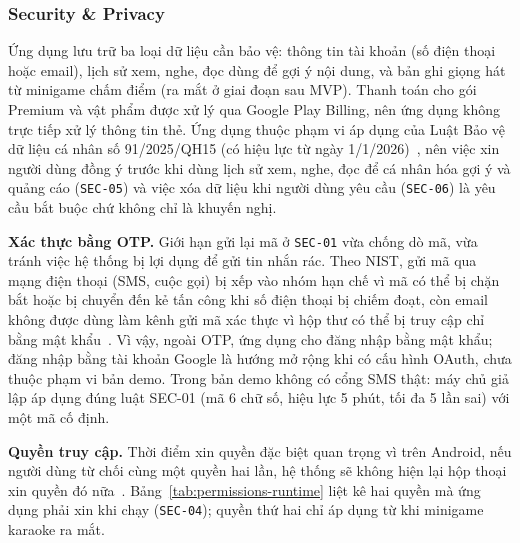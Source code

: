\subsubsection{Security \& Privacy}

Ứng dụng lưu trữ ba loại dữ liệu cần bảo vệ: thông tin tài khoản (số điện thoại hoặc email), lịch sử xem, nghe, đọc dùng để gợi ý nội dung, và bản ghi giọng hát từ minigame chấm điểm (ra mắt ở giai đoạn sau MVP).
Thanh toán cho gói Premium và vật phẩm được xử lý qua Google Play Billing, nên ứng dụng không trực tiếp xử lý thông tin thẻ.
Ứng dụng thuộc phạm vi áp dụng của Luật Bảo vệ dữ liệu cá nhân số 91/2025/QH15 (có hiệu lực từ ngày 1/1/2026)~\cite{luat-bvdlcn-2025}, nên việc xin người dùng đồng ý trước khi dùng lịch sử xem, nghe, đọc để cá nhân hóa gợi ý và quảng cáo (\texttt{SEC-05}) và việc xóa dữ liệu khi người dùng yêu cầu (\texttt{SEC-06}) là yêu cầu bắt buộc chứ không chỉ là khuyến nghị.

\textbf{Xác thực bằng OTP.}
Giới hạn gửi lại mã ở \texttt{SEC-01} vừa chống dò mã, vừa tránh việc hệ thống bị lợi dụng để gửi tin nhắn rác.
Theo NIST, gửi mã qua mạng điện thoại (SMS, cuộc gọi) bị xếp vào nhóm hạn chế vì mã có thể bị chặn bắt hoặc bị chuyển đến kẻ tấn công khi số điện thoại bị chiếm đoạt, còn email không được dùng làm kênh gửi mã xác thực vì hộp thư có thể bị truy cập chỉ bằng mật khẩu~\cite{nist80063b4}.
Vì vậy, ngoài OTP, ứng dụng cho đăng nhập bằng mật khẩu; đăng nhập bằng tài khoản Google là hướng mở rộng khi có cấu hình OAuth, chưa thuộc phạm vi bản demo. Trong bản demo không có cổng SMS thật: máy chủ giả lập áp dụng đúng luật SEC-01 (mã 6 chữ số, hiệu lực 5 phút, tối đa 5 lần sai) với một mã cố định.

\textbf{Quyền truy cập.}
Thời điểm xin quyền đặc biệt quan trọng vì trên Android, nếu người dùng từ chối cùng một quyền hai lần, hệ thống sẽ không hiện lại hộp thoại xin quyền đó nữa~\cite{android-permissions}.
Bảng~\ref{tab:permissions-runtime} liệt kê hai quyền mà ứng dụng phải xin khi chạy (\texttt{SEC-04}); quyền thứ hai chỉ áp dụng từ khi minigame karaoke ra mắt.

